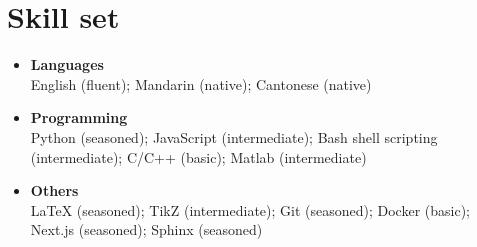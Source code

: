 \documentclass[letterpaper,11pt]{article}
\begin{document}
    \section{Skill set}

    \begin{itemize}[leftmargin=0.15in, label={}, itemsep=0em]
        \item \textbf{Languages}\\
        English (fluent); Mandarin (native); Cantonese (native)
        \item \textbf{Programming}\\
        Python (seasoned); JavaScript (intermediate); Bash shell scripting (intermediate); C/C++ (basic); Matlab (intermediate)
        \item \textbf{Others}\\
        LaTeX (seasoned); TikZ (intermediate); Git (seasoned); Docker (basic); Next.js (seasoned); Sphinx (seasoned)
    \end{itemize}
\end{document}
